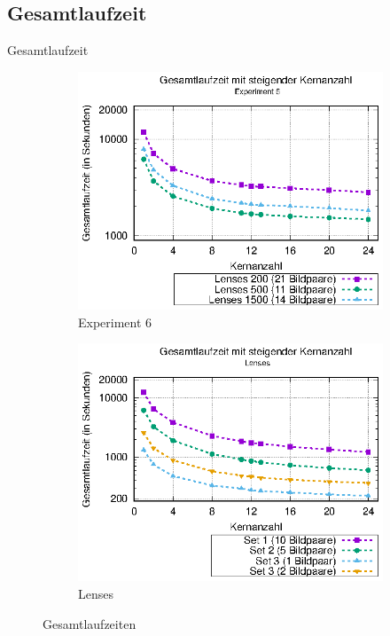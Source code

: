 \subsection{Gesamtlaufzeit}
\begin{frame}{Gesamtlaufzeit}
	\begin{center}
		\begin{figure}[h]
			\begin{subfigure}[b]{0.49\linewidth}
				\centering
				\includegraphics[width=\linewidth]{pdf/times_exp6}
				\caption{Experiment 6}
			\end{subfigure}
			\hfill
			\begin{subfigure}[b]{0.49\linewidth}
				\centering
				\includegraphics[width=\linewidth]{pdf/times_lenses}
				\caption{Lenses}
			\end{subfigure}
			\caption{Gesamtlaufzeiten}
		\end{figure}
	\end{center}
\end{frame}

